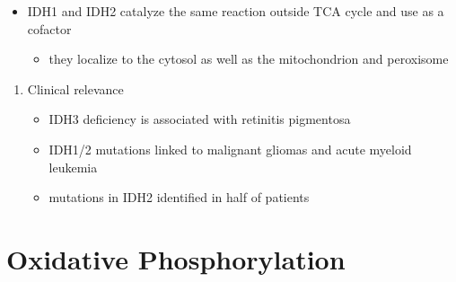 \documentclass{scrartcl}
\begin{document}

\begin{itemize}
\item IDH1 and IDH2 catalyze the same reaction outside TCA cycle and use
 as a cofactor
\begin{itemize}
\item they localize to the cytosol as well as the mitochondrion and peroxisome
\end{itemize}
\end{itemize}


\begin{enumerate}
\item Clinical relevance
\label{sec:org13e2b10}
\begin{itemize}
\item IDH3 deficiency is associated with retinitis pigmentosa
\item IDH1/2 mutations linked to malignant gliomas and acute myeloid leukemia
\item mutations in IDH2 identified in half of patients
\end{itemize}
\end{enumerate}
\section{Oxidative Phosphorylation}
\label{sec:org07f79b8}
\end{document}
